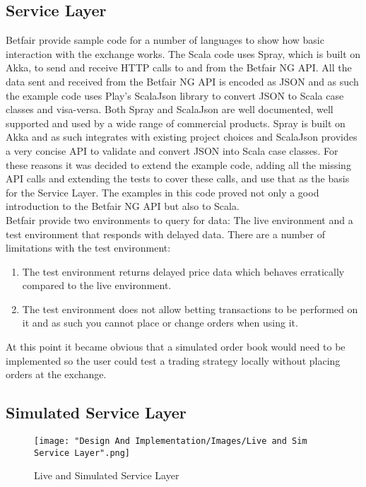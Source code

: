 	\subsection{Service Layer}
		Betfair provide sample code for a number of languages to show how basic interaction with the exchange works\cite{BetfairSampleCode}. The Scala code\cite{BetfairScalaSample} uses Spray\cite{Spray}, which is built on Akka, to send and receive HTTP calls to and from the Betfair NG API. All the data sent and received from the Betfair NG API is encoded as JSON and as such the example code uses Play's ScalaJson library\cite{PlayJSON} to convert JSON to Scala case classes and visa-versa. Both Spray and ScalaJson are well documented, well supported and used by a wide range of commercial products. Spray is built on Akka and as such integrates with existing project choices and ScalaJson provides a very concise API to validate and convert JSON into Scala case classes. For these reasons it was decided to extend the example code, adding all the missing API calls and extending the tests to cover these calls, and use that as the basis for the Service Layer. The examples in this code proved not only a good introduction to the Betfair NG API but also to Scala.\\
		
		Betfair provide two environments to query for data: The live environment and a test environment that responds with delayed data. There are a number of limitations with the test environment:
		\begin{enumerate}
			\item The test environment returns delayed price data which behaves erratically compared to the live environment.
			\item The test environment does not allow betting transactions to be performed on it and as such you cannot place or change orders when using it\cite{BetfairDelayedApplicationKeys}.
		\end{enumerate}
		 
		At this point it became obvious that a simulated order book would need to be implemented so the user could test a trading strategy locally without placing orders at the exchange.
		
	\subsection{Simulated Service Layer}		
		
		\begin{figure}[h]
			\texttt{[image: "Design And Implementation/Images/Live and Sim Service Layer".png]}
			\centering
			\caption{Live and Simulated Service Layer}
    			\label{fig:liveSimServiceLayer}
		\end{figure}
		
